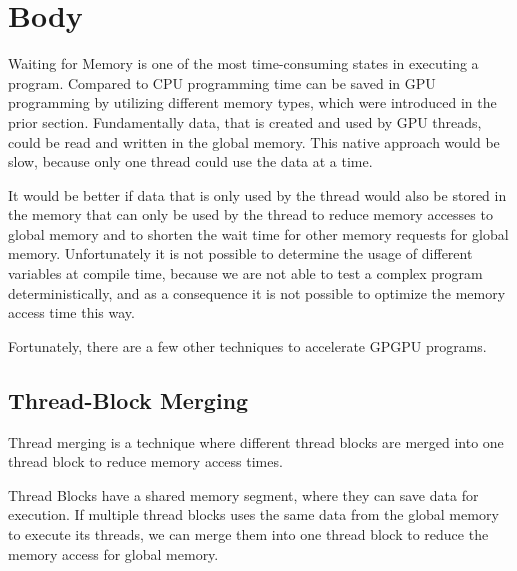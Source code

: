 \documentclass[conference]{IEEEtran}
\begin{document}
		
		
		


\section{Body}

	Waiting for Memory is one of the most time-consuming states in executing a program. Compared to CPU programming time can be saved in GPU programming by utilizing different memory types, which were introduced in the prior section. Fundamentally data, that is created and used by GPU threads, could be read and written in the global memory. This native approach would be slow, because only one thread could use the data at a time.
	
	It would be better if data that is only used by the thread would also be stored in the memory that can only be used by the thread to reduce memory accesses to global memory and to shorten the wait time for other memory requests for global memory.
	Unfortunately it is not possible to determine the usage of different variables at compile time, because we are not able to test a complex program deterministically, and as a consequence it is not possible to optimize the memory access time this way.

	Fortunately, there are a few other techniques to accelerate GPGPU programs.
	

	
	\subsection{Thread-Block Merging}
	
	
	Thread merging is a technique where different thread blocks are merged into one thread block to reduce memory access times.
	
	
	Thread Blocks have a shared memory segment, where they can save data for execution. If multiple thread blocks uses the same data from the global memory to execute its threads, we can merge them into one thread block to reduce the memory access for global memory.
	
\end{document}
